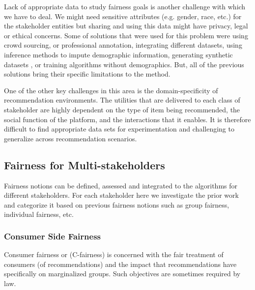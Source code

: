 Lack of appropriate data to study fairness goals is another challenge with which we have to deal. We might need sensitive attributes (e.g. gender, race, etc.) for the stakeholder entities but sharing and using this data might have privacy, legal or ethical concerns. Some of solutions that were used for this problem were using crowd sourcing\cite{biega2020overview}, or professional annotation, integrating different datasets, using inference methods to impute demographic information, generating synthetic datasets \cite{burke2018synthetic}, or training algorithms without demographics\cite{Kallus2020Assessing}. But, all of the previous solutions bring their specific limitations to the method. 

One of the other key challenges in this area is the domain-specificity of recommendation environments. The utilities that are delivered to each class of stakeholder are highly dependent on the type of item being recommended, the social function of the platform, and the interactions that it enables. It is therefore difficult to find appropriate data sets for experimentation and challenging to generalize across recommendation scenarios.

\subsection{Fairness for Multi-stakeholders}
Fairness notions can be defined, assessed and integrated to the algorithms for different stakeholders. For each stakeholder here we investigate the prior work and categorize it based on previous fairness notions such as group fairness, individual fairness, etc.

\subsubsection{Consumer Side Fairness}
Consumer fairness or (C-fairness) is concerned with the fair treatment of consumers (of recommendations) and the impact that recommendations have specifically on marginalized groups. Such objectives are sometimes required by law.
    
